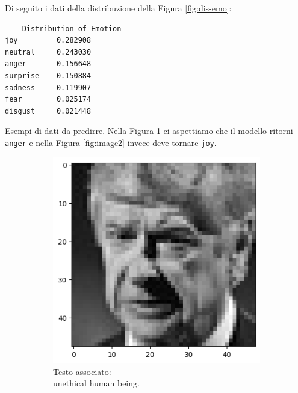 \documentclass{article}
\begin{document}
Di seguito i dati della distribuzione della Figura \ref{fig:dis-emo}:
\begin{lstlisting}
--- Distribution of Emotion ---
joy         0.282908
neutral     0.243030
anger       0.156648
surprise    0.150884
sadness     0.119907
fear        0.025174
disgust     0.021448
\end{lstlisting}

\bigskip

Esempi di dati da predirre. Nella Figura \ref{fig:image1} ci aspettiamo che il modello ritorni \verb|anger| e nella Figura \ref{fig:image2} invece deve tornare \verb|joy|.
\begin{figure}[H]
    \centering
    \begin{subfigure}{0.4\linewidth}
        \includegraphics[width=\linewidth]{image.png}
        \caption{Testo associato:\\ unethical human being.}
        \label{fig:image1}
    \end{subfigure}
    \hfill
    \begin{subfigure}{0.4\linewidth}

\end{subfigure}
\end{figure}
\end{document}

